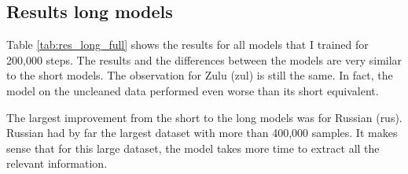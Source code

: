 \subsection{Results long models}

Table \ref{tab:res_long_full} shows the results for all models that I trained for 200,000 steps. The results and the differences between the models are very similar to the short models. The observation for Zulu (zul) is still the same. In fact, the model on the uncleaned data performed even worse than its short equivalent.

The largest improvement from the short to the long models was for Russian (rus). Russian had by far the largest dataset with more than 400,000 samples. It makes sense that for this large dataset, the model takes more time to extract all the relevant information. 

